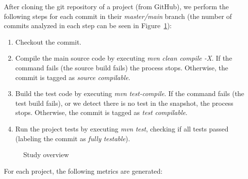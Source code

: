 After cloning the git repository of a project (from GitHub), we perform the following steps for each commit in their \textit{master/main} branch (the number of commits analyzed in each step can be seen in Figure~\ref{fig:methodology-process}):

\begin{enumerate}
    \item Checkout the commit.
    \item Compile the main source code by executing \textit{mvn clean compile -X}. If the command fails (the source build fails) the process stops. Otherwise, the commit is tagged as \textit{source compilable}.
    \item Build the test code by executing \textit{mvn test-compile}. If the command fails (the test build fails), or we detect there is no test in the snapshot, the process stops. Otherwise, the commit is tagged as \textit{test compilable}.
    \item Run the project tests by executing \textit{mvn test}, checking if all tests passed (labeling the commit as \textit{fully testable}).
\end{enumerate}


\begin{figure}[h!]
    \centering    
    
    \caption{Study overview}
    \label{fig:methodology-process}
\end{figure}


For each project, the following metrics are generated:

